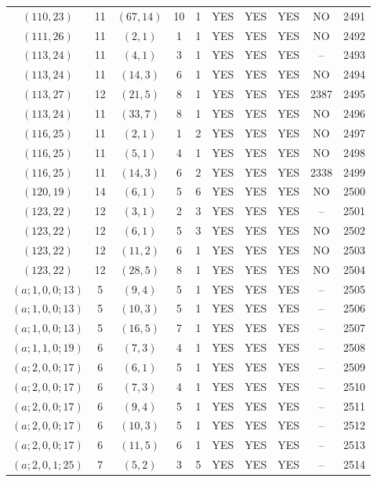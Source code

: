 \begin{longtable}{|c|c|c|c|c|c|c|c|c|c|}
$(110, 23)$ & 11 & $(67, 14)$ & 10 & 1 & YES & YES & YES & NO & 2491\\
$(111, 26)$ & 11 & $(2, 1)$ & 1 & 1 & YES & YES & YES & NO & 2492\\
$(113, 24)$ & 11 & $(4, 1)$ & 3 & 1 & YES & YES & YES & -- & 2493\\
$(113, 24)$ & 11 & $(14, 3)$ & 6 & 1 & YES & YES & YES & NO & 2494\\
$(113, 27)$ & 12 & $(21, 5)$ & 8 & 1 & YES & YES & YES & 2387 & 2495\\
$(113, 24)$ & 11 & $(33, 7)$ & 8 & 1 & YES & YES & YES & NO & 2496\\
$(116, 25)$ & 11 & $(2, 1)$ & 1 & 2 & YES & YES & YES & NO & 2497\\
$(116, 25)$ & 11 & $(5, 1)$ & 4 & 1 & YES & YES & YES & NO & 2498\\
$(116, 25)$ & 11 & $(14, 3)$ & 6 & 2 & YES & YES & YES & 2338 & 2499\\
$(120, 19)$ & 14 & $(6, 1)$ & 5 & 6 & YES & YES & YES & NO & 2500\\
$(123, 22)$ & 12 & $(3, 1)$ & 2 & 3 & YES & YES & YES & -- & 2501\\
$(123, 22)$ & 12 & $(6, 1)$ & 5 & 3 & YES & YES & YES & NO & 2502\\
$(123, 22)$ & 12 & $(11, 2)$ & 6 & 1 & YES & YES & YES & NO & 2503\\
$(123, 22)$ & 12 & $(28, 5)$ & 8 & 1 & YES & YES & YES & NO & 2504\\
$(a; 1, 0, 0; 13)$ & 5 & $(9, 4)$ & 5 & 1 & YES & YES & YES & -- & 2505\\
$(a; 1, 0, 0; 13)$ & 5 & $(10, 3)$ & 5 & 1 & YES & YES & YES & -- & 2506\\
$(a; 1, 0, 0; 13)$ & 5 & $(16, 5)$ & 7 & 1 & YES & YES & YES & -- & 2507\\
$(a; 1, 1, 0; 19)$ & 6 & $(7, 3)$ & 4 & 1 & YES & YES & YES & -- & 2508\\
$(a; 2, 0, 0; 17)$ & 6 & $(6, 1)$ & 5 & 1 & YES & YES & YES & -- & 2509\\
$(a; 2, 0, 0; 17)$ & 6 & $(7, 3)$ & 4 & 1 & YES & YES & YES & -- & 2510\\
$(a; 2, 0, 0; 17)$ & 6 & $(9, 4)$ & 5 & 1 & YES & YES & YES & -- & 2511\\
$(a; 2, 0, 0; 17)$ & 6 & $(10, 3)$ & 5 & 1 & YES & YES & YES & -- & 2512\\
$(a; 2, 0, 0; 17)$ & 6 & $(11, 5)$ & 6 & 1 & YES & YES & YES & -- & 2513\\
$(a; 2, 0, 1; 25)$ & 7 & $(5, 2)$ & 3 & 5 & YES & YES & YES & -- & 2514\\

\end{longtable}
